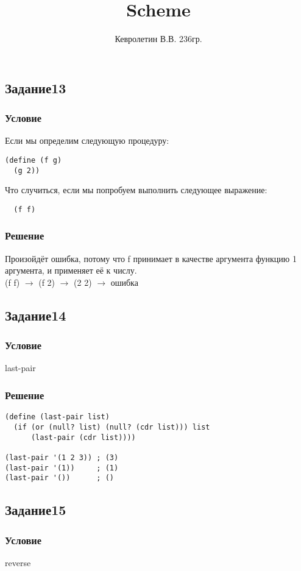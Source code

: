\documentclass[10pt,a4paper]{article}
\author{Кевролетин В.В. 236гр.}
\title{Scheme}
\begin{document}
\maketitle

\subsection*{Задание13}
\subsubsection*{Условие}
Если мы определим следующую процедуру:
\begin{lstlisting}
(define (f g)
  (g 2))
\end{lstlisting}
Что случиться, если мы попробуем выполнить следующее выражение:
\begin{lstlisting}
  (f f)
\end{lstlisting}

\subsubsection*{Решение}
Произойдёт ошибка, потому что f принимает в качестве аргумента функцию
1 аргумента, и применяет её к числу. \\
(f f) $\rightarrow $ (f 2) $\rightarrow$ (2 2) $\rightarrow$ ошибка

\subsection*{Задание14}
\subsubsection*{Условие}
last-pair
\subsubsection*{Решение}
\begin{lstlisting}
(define (last-pair list)
  (if (or (null? list) (null? (cdr list))) list
      (last-pair (cdr list))))

(last-pair '(1 2 3)) ; (3)
(last-pair '(1))     ; (1)
(last-pair '())      ; ()
\end{lstlisting}

\subsection*{Задание15}
\subsubsection*{Условие}
reverse
\end{document}
